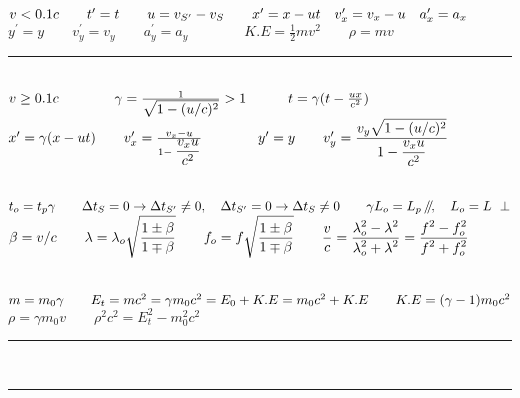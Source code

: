 \documentclass[a4paper,12pt]{article}
\newcommand{\slparallel}{\mathbin{\!/\mkern-5mu/\!}}
\begin{document}

\fontsize{14.5}{16}\selectfont

\noindent
$v < 0.1c \qquad t^\prime = t \qquad u = v_{S^\prime} - v_S \qquad x^\prime = x - ut \quad v^\prime_x = v_x - u \quad a_x^\prime = a_x \\[+2mm]$
$ y^\prime = y \qquad v^\prime_y = v_y \qquad a_y^\prime = a_y \qquad \qquad K.E = \frac{1}{2} mv^2 \qquad \rho = mv $

{\centering \rule{10cm}{0.4pt} \par}

\ \\
\noindent
$ v \ge 0.1c \qquad \qquad \gamma = \frac{1}{\displaystyle \sqrt{1- (u/c)^2}} > 1 \qquad \quad t = \gamma (t - \frac{ux}{c^2})\\$
$x^\prime = \gamma(x - ut) \qquad v^\prime_x = \frac{v_x - u}{1- \displaystyle \frac{v_x u}{c^2} } \qquad \qquad  y^\prime = y \qquad v^\prime_y = \displaystyle \frac{\displaystyle v_y \sqrt{1-(u/c)^2}}{\displaystyle 1- \frac{v_x u}{c^2}}\\[-3mm]$

{\centering \hdashrule{10cm}{0.4pt}{4pt} \par}

\ \\
\noindent
$ t_o = t_p \gamma \qquad \Delta t_S = 0 \rightarrow \Delta t_{S^\prime} \neq 0, \quad \Delta t_{S^\prime} = 0 \rightarrow \Delta t_S \neq 0 \qquad \gamma L_o = L_p \ \slparallel, \quad L_o = L \ \perp \\[+2mm]$
$ \beta = v/c \qquad \lambda = \lambda_o \displaystyle \sqrt{\frac{1\pm \beta}{1\mp \beta}} \qquad f_o = f \displaystyle \sqrt{\frac{1\pm \beta}{1\mp \beta}} \qquad \frac{v}{c} = \frac{\displaystyle \lambda_o^2 - \lambda^2}{\displaystyle \lambda_o^2 + \lambda^2} = \frac{\displaystyle f^2 - f_o^2}{\displaystyle f^2 + f_o^2} \\[-1mm]$

{\centering \hdashrule{10cm}{0.4pt}{4pt} \par}

\ \\
\noindent
$ m = m_0 \gamma \qquad E_t = mc^2 = \gamma m_0c^2 = E_0 + K.E = m_0c^2 + K.E \qquad K.E = (\gamma - 1) m_0c^2 \\[+2mm]$
$\rho = \gamma m_0v \qquad \rho^2c^2 = E_t^2 - m_0^2c^2$

{\centering \rule{10cm}{0.8pt}\\\rule[\dimexpr \ht\strutbox+0.1cm]{7cm}{0.8pt} \par}
\end{document}
